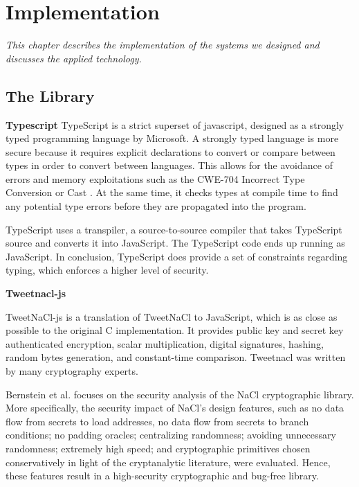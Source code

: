 \chapter{Implementation} \label{chap:System_implementation}
\textit{This chapter describes the implementation of the systems we designed and discusses the applied technology.}

\minitoc

\section{The Library}
\bigskip
{\textbf{Typescript}}
TypeScript is a strict superset of javascript, designed as a strongly typed programming language by Microsoft. A strongly typed language is more secure because it requires explicit declarations to convert or compare between types in order to convert between languages. This allows for the avoidance of errors and memory exploitations such as the CWE-704 Incorrect Type Conversion or Cast \cite{cwe}. At the same time, it checks types at compile time to find any potential type errors before they are propagated into the program.

TypeScript uses a transpiler, a source-to-source compiler that takes TypeScript source and converts it into JavaScript. The TypeScript code ends up running as JavaScript. In conclusion, TypeScript does provide a set of constraints regarding typing, which enforces a higher level of security.

\bigskip
{\textbf{Tweetnacl-js}}

TweetNaCl-js is a translation of TweetNaCl to JavaScript, which is as close as possible to the original C implementation. It provides public key and secret key authenticated encryption, scalar multiplication, digital signatures, hashing, random bytes generation, and constant-time comparison. Tweetnacl was written by many cryptography experts.

Bernstein et al. \cite{Bernstein2012} focuses on the security analysis of the NaCl cryptographic library.
More specifically, the security impact of NaCl's design features, such as no data flow
from secrets to load addresses, no data flow from secrets to branch conditions; no padding oracles; centralizing randomness; avoiding unnecessary randomness; extremely high speed; and cryptographic primitives chosen conservatively in light of the cryptanalytic literature, were evaluated. Hence, these features result in a high-security cryptographic and bug-free library.

